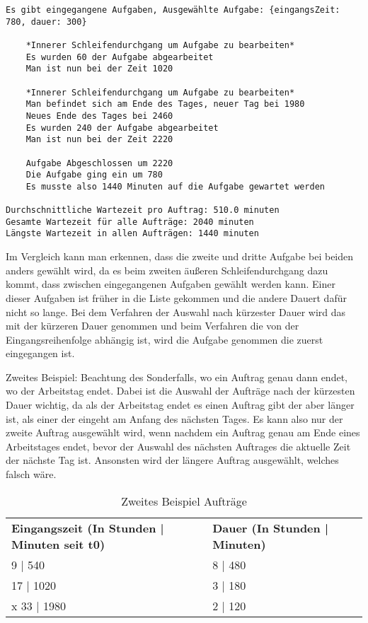 \documentclass[a4paper,10pt,ngerman]{scrartcl}
\begin{document}
\begin{lstlisting}[numbers=none]
Es gibt eingegangene Aufgaben, Ausgewählte Aufgabe: {eingangsZeit: 780, dauer: 300}

    *Innerer Schleifendurchgang um Aufgabe zu bearbeiten*
    Es wurden 60 der Aufgabe abgearbeitet
    Man ist nun bei der Zeit 1020

    *Innerer Schleifendurchgang um Aufgabe zu bearbeiten*
    Man befindet sich am Ende des Tages, neuer Tag bei 1980
    Neues Ende des Tages bei 2460
    Es wurden 240 der Aufgabe abgearbeitet
    Man ist nun bei der Zeit 2220

    Aufgabe Abgeschlossen um 2220
    Die Aufgabe ging ein um 780
    Es musste also 1440 Minuten auf die Aufgabe gewartet werden

Durchschnittliche Wartezeit pro Auftrag: 510.0 minuten
Gesamte Wartezeit für alle Aufträge: 2040 minuten
Längste Wartezeit in allen Aufträgen: 1440 minuten
\end{lstlisting}

Im Vergleich kann man erkennen, dass die zweite und dritte Aufgabe bei beiden anders gewählt wird,
da es beim zweiten äußeren Schleifendurchgang dazu kommt, dass zwischen eingegangenen Aufgaben gewählt werden kann.
Einer dieser Aufgaben ist früher in die Liste gekommen und die andere Dauert dafür nicht so lange.
Bei dem Verfahren der Auswahl nach kürzester Dauer wird das mit der kürzeren Dauer genommen und
beim Verfahren die von der Eingangsreihenfolge abhängig ist,
wird die Aufgabe genommen die zuerst eingegangen ist.


Zweites Beispiel: Beachtung des Sonderfalls, wo ein Auftrag genau dann endet, wo der Arbeitstag endet.
Dabei ist die Auswahl der Aufträge nach der kürzesten Dauer wichtig,
da als der Arbeitstag endet es einen Auftrag gibt der aber länger ist,
als einer der eingeht am Anfang des nächsten Tages.
Es kann also nur der zweite Auftrag ausgewählt wird,
wenn nachdem ein Auftrag genau am Ende eines Arbeitstages endet,
bevor der Auswahl des nächsten Auftrages die aktuelle Zeit der nächste Tag ist.
Ansonsten wird der längere Auftrag ausgewählt, welches falsch wäre.

 \begin{table}[htb]
    \centering
    \begin{tabular}{lll}
    \textbf{Eingangszeit (In Stunden | Minuten seit t0)} & \textbf{Dauer (In Stunden | Minuten)} \\
    9 | 540 & 8 | 480 \\
    17 | 1020 & 3 | 180 \\
x    33 | 1980 & 2 | 120 \\
    \end{tabular}
    \caption{Zweites Beispiel Aufträge}
    \label{tab:Table1}
 \end{table}
\end{document}
